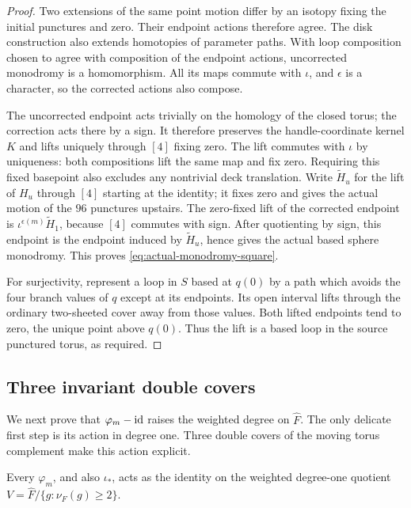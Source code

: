\begin{proof}
Two extensions of the same point motion differ by an isotopy fixing
the initial punctures and zero.  Their endpoint actions therefore
agree.  The disk construction also extends homotopies of parameter
paths.  With loop composition chosen to agree with composition of
the endpoint actions, uncorrected monodromy is a homomorphism.
All its maps commute with $\iota$, and $\epsilon$ is a character,
so the corrected actions also compose.

The uncorrected endpoint acts trivially on the homology of the
closed torus; the correction acts there by a sign.  It therefore
preserves the handle-coordinate kernel $K$ and lifts uniquely
through $[4]$ fixing zero.  The lift commutes with $\iota$ by
uniqueness: both compositions lift the same map and fix zero.
Requiring this fixed basepoint also excludes any nontrivial deck
translation. Write $\widetilde H_u$ for the lift of $H_u$ through
$[4]$ starting at the identity; it fixes zero and gives the actual
motion of the $96$ punctures upstairs. The zero-fixed lift of the
corrected endpoint is $\iota^{\epsilon(m)}\widetilde H_1$, because
$[4]$ commutes with sign. After quotienting by sign, this endpoint
is the endpoint induced by $\widetilde H_u$, hence gives the actual
based sphere monodromy. This proves \eqref{eq:actual-monodromy-square}.

For surjectivity, represent a loop in $S$ based at $q(0)$ by a path
which avoids the four branch values of $q$ except at its endpoints.
Its open interval lifts through the ordinary two-sheeted cover
away from those values.  Both lifted endpoints tend to zero,
the unique point above $q(0)$.  Thus the lift is a based loop in
the source punctured torus, as required.
\end{proof}

\subsection{Three invariant double covers}

We next prove that $\varphi_m-\operatorname{id}$ raises the weighted degree on
$\widehat F$.  The only delicate first step is its action in degree
one.  Three double covers of the moving torus complement make this
action explicit.

\begin{lemma}\label{lem:degree-one}
Every $\varphi_m$, and also $\iota_*$, acts as the identity on
the weighted degree-one quotient
$V=\widehat F/\{g:\nu_F(g)\ge2\}$.
\end{lemma}


